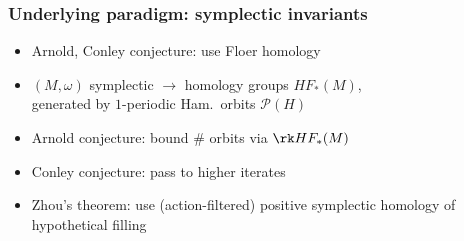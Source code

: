 \begin{frame}
  \frametitle{Underlying paradigm: symplectic invariants}
  \begin{itemize}
    \item Arnold, Conley conjecture: use  Floer homology

    \item $(M,\omega)$ symplectic $\to$ homology groups $HF_\ast(M)$,\\ generated by $1$-periodic Ham.\ orbits $\mathcal{P}(H)$
    \item Arnold conjecture: bound \# orbits via $\rk HF_*(M)$

    \item Conley conjecture: pass to higher iterates
    \item Zhou's theorem: use (action-filtered) positive symplectic homology of hypothetical filling
  \end{itemize}
\end{frame}

